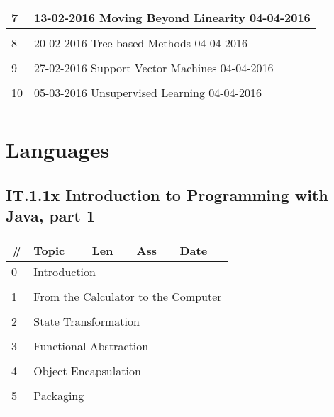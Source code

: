 \documentclass[a4paper,12pt]{article} %
\begin{document}
\begin{longtable}{|l|p{11cm}|l|c|l|}
	\hline
	7 & \multicolumn{4}{|l|}{13-02-2016 \hfill Moving Beyond Linearity \hfill 04-04-2016}\\
	\hline
	& & & &  \\
	\hline
	8 & \multicolumn{4}{|l|}{20-02-2016 \hfill Tree-based Methods \hfill 04-04-2016}\\
	\hline
	& & & &  \\
	\hline
	9 & \multicolumn{4}{|l|}{27-02-2016 \hfill Support Vector Machines \hfill 04-04-2016}\\
	\hline
	& & & &  \\
	\hline
	10 & \multicolumn{4}{|l|}{05-03-2016 \hfill Unsupervised Learning \hfill 04-04-2016}\\
	\hline
	& & & &  \\
	\hline
\end{longtable}



\newpage
\section{Languages}
\subsection{IT.1.1x Introduction to Programming with Java, part 1}

\begin{longtable}{|l|p{11cm}|l|l|l|}
	\hline
	\# & Topic & Len & Ass & Date \\
	\hline
	0 & \multicolumn{4}{|l|}{Introduction}\\
	\hline
	& & & &  \\
	\hline
	1 & \multicolumn{4}{|l|}{From the Calculator to the Computer}\\
	\hline
	& & & &  \\
	\hline
	2 & \multicolumn{4}{|l|}{State Transformation}\\
	\hline
	& & & &  \\
	\hline
	3 & \multicolumn{4}{|l|}{Functional Abstraction}\\
	\hline
	& & & &  \\
	\hline
	4 & \multicolumn{4}{|l|}{Object Encapsulation}\\
	\hline
	& & & &  \\
	\hline
	5 & \multicolumn{4}{|l|}{Packaging}\\
	\hline
	& & & &  \\
	\hline
\end{longtable}

\end{document}
